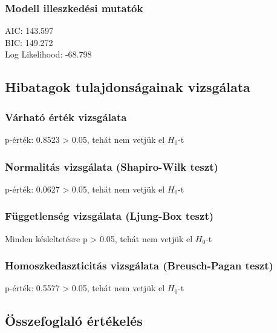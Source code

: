 \documentclass[11pt]{article}
\begin{document}
\subsubsection{Modell illeszkedési
mutatók}\label{modell-illeszkeduxe9si-mutatuxf3k}

AIC: 143.597\\
BIC: 149.272\\
Log Likelihood: -68.798

\subsection{Hibatagok tulajdonságainak
vizsgálata}\label{hibatagok-tulajdonsuxe1gainak-vizsguxe1lata}

\subsubsection{Várható érték
vizsgálata}\label{vuxe1rhatuxf3-uxe9rtuxe9k-vizsguxe1lata}

p-érték: 0.8523 \textgreater{} 0.05, tehát nem vetjük el $H_0$-t

\subsubsection{Normalitás vizsgálata (Shapiro-Wilk
teszt)}\label{normalituxe1s-vizsguxe1lata-shapiro-wilk-teszt}

p-érték: 0.0627 \textgreater{} 0.05, tehát nem vetjük el $H_0$-t

\subsubsection{Függetlenség vizsgálata (Ljung-Box
teszt)}\label{fuxfcggetlensuxe9g-vizsguxe1lata-ljung-box-teszt}

Minden késleltetésre p \textgreater{} 0.05, tehát nem vetjük el $H_0$-t

\subsubsection{Homoszkedaszticitás vizsgálata (Breusch-Pagan
teszt)}\label{homoszkedaszticituxe1s-vizsguxe1lata-breusch-pagan-teszt}

p-érték: 0.5577 \textgreater{} 0.05, tehát nem vetjük el $H_0$-t

\subsection{Összefoglaló
értékelés}\label{uxf6sszefoglaluxf3-uxe9rtuxe9keluxe9s}
\end{document}
